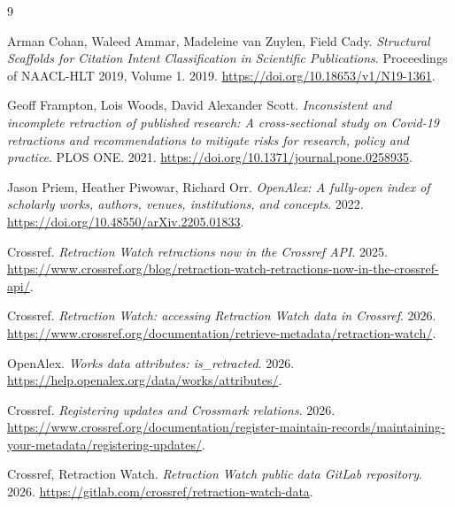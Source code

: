 \begin{thebibliography}{9}

Arman Cohan, Waleed Ammar, Madeleine van Zuylen, Field Cady. \emph{Structural Scaffolds for Citation Intent Classification in Scientific Publications}. Proceedings of NAACL-HLT 2019, Volume 1. 2019. \url{https://doi.org/10.18653/v1/N19-1361}.

Geoff Frampton, Lois Woods, David Alexander Scott. \emph{Inconsistent and incomplete retraction of published research: A cross-sectional study on Covid-19 retractions and recommendations to mitigate risks for research, policy and practice}. PLOS ONE. 2021. \url{https://doi.org/10.1371/journal.pone.0258935}.

Jason Priem, Heather Piwowar, Richard Orr. \emph{OpenAlex: A fully-open index of scholarly works, authors, venues, institutions, and concepts}. 2022. \url{https://doi.org/10.48550/arXiv.2205.01833}.

{Crossref}. \emph{Retraction Watch retractions now in the Crossref API}. 2025. \url{https://www.crossref.org/blog/retraction-watch-retractions-now-in-the-crossref-api/}.

{Crossref}. \emph{Retraction Watch: accessing Retraction Watch data in Crossref}. 2026. \url{https://www.crossref.org/documentation/retrieve-metadata/retraction-watch/}.

{OpenAlex}. \emph{Works data attributes: is\_retracted}. 2026. \url{https://help.openalex.org/data/works/attributes/}.

{Crossref}. \emph{Registering updates and Crossmark relations}. 2026. \url{https://www.crossref.org/documentation/register-maintain-records/maintaining-your-metadata/registering-updates/}.

{Crossref, Retraction Watch}. \emph{Retraction Watch public data GitLab repository}. 2026. \url{https://gitlab.com/crossref/retraction-watch-data}.

\end{thebibliography}
